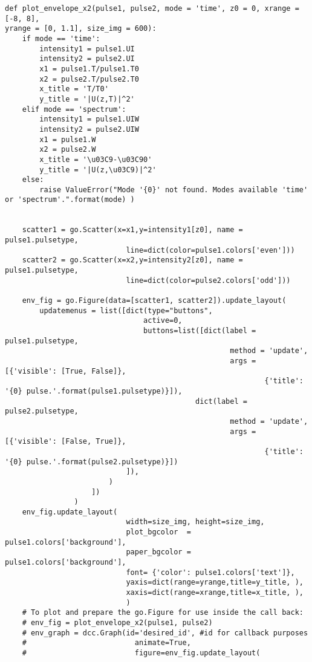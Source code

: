 \begin{verbatim}
def plot_envelope_x2(pulse1, pulse2, mode = 'time', z0 = 0, xrange = [-8, 8],
yrange = [0, 1.1], size_img = 600):
    if mode == 'time':
        intensity1 = pulse1.UI
        intensity2 = pulse2.UI
        x1 = pulse1.T/pulse1.T0
        x2 = pulse2.T/pulse2.T0
        x_title = 'T/T0'
        y_title = '|U(z,T)|^2'
    elif mode == 'spectrum':
        intensity1 = pulse1.UIW
        intensity2 = pulse2.UIW
        x1 = pulse1.W
        x2 = pulse2.W
        x_title = '\u03C9-\u03C90'
        y_title = '|U(z,\u03C9)|^2'
    else:
        raise ValueError("Mode '{0}' not found. Modes available 'time' or 'spectrum'.".format(mode) )
    

    scatter1 = go.Scatter(x=x1,y=intensity1[z0], name = pulse1.pulsetype,
                            line=dict(color=pulse1.colors['even']))
    scatter2 = go.Scatter(x=x2,y=intensity2[z0], name = pulse1.pulsetype,
                            line=dict(color=pulse2.colors['odd']))
    
    env_fig = go.Figure(data=[scatter1, scatter2]).update_layout(    
        updatemenus = list([dict(type="buttons",
                                active=0,
                                buttons=list([dict(label = pulse1.pulsetype,
                                                    method = 'update',
                                                    args = [{'visible': [True, False]},
                                                            {'title': '{0} pulse.'.format(pulse1.pulsetype)}]), 
                                            dict(label = pulse2.pulsetype,
                                                    method = 'update',
                                                    args = [{'visible': [False, True]},
                                                            {'title': '{0} pulse.'.format(pulse2.pulsetype)}])
                            ]),
                        )
                    ])
                )
    env_fig.update_layout( 
                            width=size_img, height=size_img,
                            plot_bgcolor  = pulse1.colors['background'],
                            paper_bgcolor = pulse1.colors['background'],
                            font= {'color': pulse1.colors['text']},
                            yaxis=dict(range=yrange,title=y_title, ), 
                            xaxis=dict(range=xrange,title=x_title, ), 
                            )
    # To plot and prepare the go.Figure for use inside the call back:
    # env_fig = plot_envelope_x2(pulse1, pulse2)
    # env_graph = dcc.Graph(id='desired_id', #id for callback purposes
    #                         animate=True,
    #                         figure=env_fig.update_layout(


\end{verbatim}
